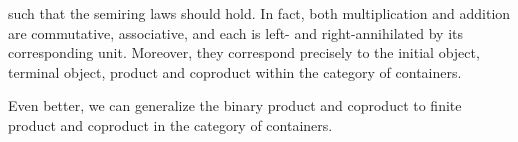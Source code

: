 \begin{code}
\AgdaSymbol{)}\AgdaSpace{}%
\AgdaSpace{}%
\AgdaSymbol{(}\AgdaSpace{}%
\AgdaSpace{}%
\AgdaSymbol{)}\AgdaSpace{}%
\AgdaSymbol{=}\AgdaSpace{}%
\AgdaSymbol{(}\AgdaSpace{}%
\AgdaSpace{}%
\AgdaSymbol{)}\AgdaSpace{}%
\AgdaSpace{}%
\AgdaSpace{}%
\AgdaSymbol{(}\AgdaSpace{}%
\AgdaSymbol{)}\AgdaSpace{}%
\AgdaSpace{}%
\AgdaSpace{}%
\AgdaSpace{}%
\AgdaSymbol{;}\AgdaSpace{}%
\AgdaSymbol{(}\AgdaSpace{}%
\AgdaSymbol{)}\AgdaSpace{}%
\AgdaSpace{}%
\AgdaSpace{}%
\AgdaSpace{}%
\AgdaSymbol{\}}\<%
\end{code}

such that the semiring laws should hold. In fact, both multiplication and addition are commutative, associative, and each is left- and right-annihilated by its corresponding unit. Moreover, they correspond precisely to the initial object, terminal object, product and coproduct within the category of containers.

Even better, we can generalize the binary product and coproduct to finite product and coproduct in the category of containers.

\begin{code}[hide]%
\>[0]\AgdaSpace{}%
\AgdaModule{\AgdaUnderscore{}}\AgdaSpace{}%
\<%
\\
\>[0][@{}l@{\AgdaIndent{0}}]%
\>[2]\AgdaSpace{}%
\<%
\end{code}


